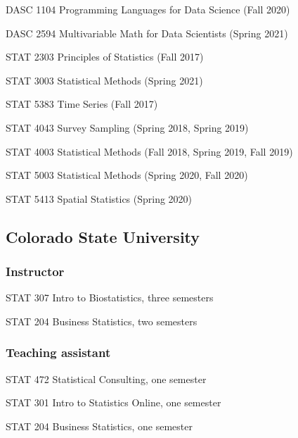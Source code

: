 \documentclass[11pt,]{article}
\providecommand{\tightlist}{%
  \setlength{\itemsep}{0pt}\setlength{\parskip}{0pt}}
\renewenvironment{itemize}{
  \begin{list}{}{
    \setlength{\leftmargin}{1.5em}
  }
}{
  \end{list}
}
\begin{document}
\begin{itemize}
\tightlist
\item
  DASC 1104 Programming Languages for Data Science (Fall 2020)
\item
  DASC 2594 Multivariable Math for Data Scientists (Spring 2021)
\item
  STAT 2303 Principles of Statistics (Fall 2017)
\item
  STAT 3003 Statistical Methods (Spring 2021)
\item
  STAT 5383 Time Series (Fall 2017)
\item
  STAT 4043 Survey Sampling (Spring 2018, Spring 2019)
\item
  STAT 4003 Statistical Methods (Fall 2018, Spring 2019, Fall 2019)
\item
  STAT 5003 Statistical Methods (Spring 2020, Fall 2020)
\item
  STAT 5413 Spatial Statistics (Spring 2020)
\end{itemize}

\hypertarget{colorado-state-university}{%
\subsection{Colorado State University}\label{colorado-state-university}}

\hypertarget{instructor}{%
\subsubsection{Instructor}\label{instructor}}

\begin{itemize}
\tightlist
\item
  STAT 307 Intro to Biostatistics, three semesters
\item
  STAT 204 Business Statistics, two semesters
\end{itemize}

\hypertarget{teaching-assistant}{%
\subsubsection{Teaching assistant}\label{teaching-assistant}}

\begin{itemize}
\tightlist
\item
  STAT 472 Statistical Consulting, one semester
\item
  STAT 301 Intro to Statistics Online, one semester
\item
  STAT 204 Business Statistics, one semester
\end{itemize}
\end{document}
